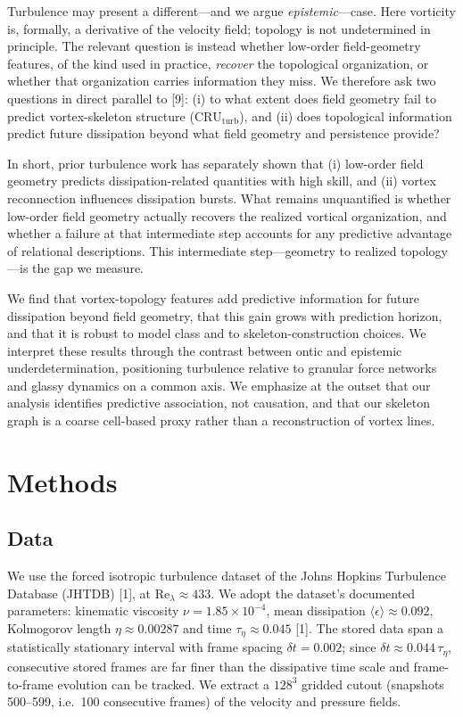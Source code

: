\documentclass[11pt,a4paper]{article}
\begin{document}
Turbulence may present a different---and we argue \emph{epistemic}---case. Here vorticity is, formally, a derivative of the velocity field; topology is not undetermined in principle. The relevant question is instead whether low-order field-geometry features, of the kind used in practice, \emph{recover} the topological organization, or whether that organization carries information they miss. We therefore ask two questions in direct parallel to [9]: (i) to what extent does field geometry fail to predict vortex-skeleton structure ($\mathrm{CRU}_{\text{turb}}$), and (ii) does topological information predict future dissipation beyond what field geometry and persistence provide?

In short, prior turbulence work has separately shown that (i) low-order field geometry predicts dissipation-related quantities with high skill, and (ii) vortex reconnection influences dissipation bursts. What remains unquantified is whether low-order field geometry actually recovers the realized vortical organization, and whether a failure at that intermediate step accounts for any predictive advantage of relational descriptions. This intermediate step---geometry to realized topology---is the gap we measure.

We find that vortex-topology features add predictive information for future dissipation beyond field geometry, that this gain grows with prediction horizon, and that it is robust to model class and to skeleton-construction choices. We interpret these results through the contrast between ontic and epistemic underdetermination, positioning turbulence relative to granular force networks and glassy dynamics on a common axis. We emphasize at the outset that our analysis identifies predictive association, not causation, and that our skeleton graph is a coarse cell-based proxy rather than a reconstruction of vortex lines.

\section{Methods}

\subsection{Data}
We use the forced isotropic turbulence dataset of the Johns Hopkins Turbulence Database (JHTDB) [1], at $\mathrm{Re}_\lambda \approx 433$. We adopt the dataset's documented parameters: kinematic viscosity $\nu = 1.85\times10^{-4}$, mean dissipation $\langle\epsilon\rangle \approx 0.092$, Kolmogorov length $\eta \approx 0.00287$ and time $\tau_\eta \approx 0.045$ [1]. The stored data span a statistically stationary interval with frame spacing $\delta t = 0.002$; since $\delta t \approx 0.044\,\tau_\eta$, consecutive stored frames are far finer than the dissipative time scale and frame-to-frame evolution can be tracked. We extract a $128^3$ gridded cutout (snapshots 500--599, i.e.\ 100 consecutive frames) of the velocity and pressure fields.
\end{document}
